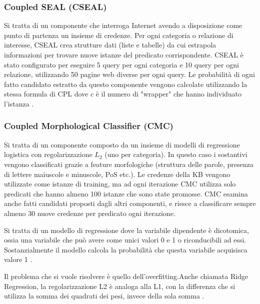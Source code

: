 \subsubsection{Coupled SEAL (CSEAL)}
Si tratta di un componente che interroga Internet avendo a disposizione come punto di partenza  un insieme di credenze. Per ogni categoria o relazione di interesse, CSEAL crea strutture dati (liste e tabelle) da cui estrapola informazioni per trovare nuove istanze del predicato corrispondente. CSEAL è stato configurato per eseguire 5 query per ogni categoria e 10 query per ogni relazione, utilizzando 50 pagine web diverse per ogni query.
Le probabilità di ogni fatto candidato estratto da questo componente vengono calcolate utilizzando la stessa formula di CPL dove $c$ è il numero di "wrapper" che hanno individuato l'istanza \cite{TowardAnArchitecture:online}.
\subsubsection{Coupled Morphological Classifier (CMC)}
Si tratta di un componente composto da un insieme di modelli di regressione logistica con regolarizzazione $L_{2}$ (uno per categoria). In questo caso i sostantivi vengono classificati grazie a feature morfologiche (struttura delle parole, presenza di lettere maiuscole e minuscole, PoS etc.). Le credenze della KB vengono utilizzate come istanze di training, ma ad ogni iterazione CMC utilizza solo predicati che hanno almeno 100 istanze che sono state promosse.
CMC esamina anche fatti candidati proposti dagli altri componenti, e riesce a classificare sempre almeno 30 nuove credenze per predicato ogni iterazione\cite{TowardAnArchitecture:online}.
\begin{info}
Si tratta di un modello di regressione dove la variabile dipendente è dicotomica, ossia una variabile che può avere come unici valori 0 e 1 o riconducibili ad essi. Sostanzialmente il modello calcola la probabilità che questa variabile acquisisca valore 1 \cite{Modellol35:online}.
\end{info}

\begin{info}[Regolarizzazione L2]
	Il problema che si vuole risolvere è quello dell'overfitting.\newline Anche chiamata Ridge Regression, la regolarizzazione L2 è analoga alla L1, con la differenza che si utilizza la somma dei quadrati dei pesi, invece della sola somma \cite{DeepLear11:online}.
\end{info}


